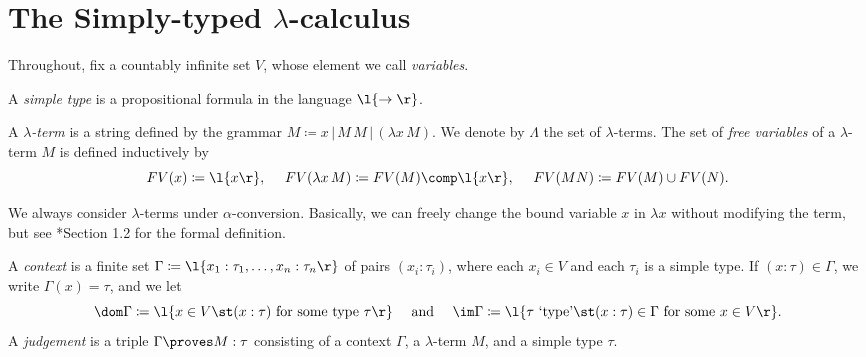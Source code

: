 \documentclass[reqno]{amsart}
\begin{document}
    \section{The Simply-typed $\lambda$-calculus}

    Throughout, fix a countably infinite set $V$, whose element we call \textit{variables}.

    \begin{definition}
        A \textit{simple type} is a propositional formula in the language $\l\{\rightarrow\r\}$.
    \end{definition}

    \begin{definition}
        A \textit{$\lambda$-term} is a string defined by the grammar $M\coloneqq x\,|\,M\,M\,|\,(\lambda x\,M)$. We denote by $\Lambda$ the set of $\lambda$-terms. The set of \textit{free variables} of a $\lambda$-term $M$ is defined inductively by
        \begin{equation*}
            FV(x)\coloneqq\l\{x\r\},\ \ \ \ FV(\lambda x\,M)\coloneqq FV(M)\comp\l\{x\r\},\ \ \ \ FV(MN)\coloneqq FV(M)\cup FV(N).
        \end{equation*}
    \end{definition}

    \begin{remark}
        We always consider $\lambda$-terms under $\alpha$-conversion. Basically, we can freely change the bound variable $x$ in $\lambda x$ without modifying the term, but see \cite{SU06}*{Section 1.2} for the formal definition.
    \end{remark}

    \begin{definition}
        A \textit{context} is a finite set $\Gamma\coloneqq\l\{x_1:\tau_1,\dots,x_n:\tau_n\r\}$ of pairs $(x_i:\tau_i)$, where each $x_i\in V$ and each $\tau_i$ is a simple type. If $(x:\tau)\in\Gamma$, we write $\Gamma(x)=\tau$, and we let
        \begin{equation*}
            \dom\Gamma\coloneqq\l\{x\in V\st(x:\tau)\textrm{ for some type }\tau\r\}\ \ \ \ \textrm{and}\ \ \ \ \im\Gamma\coloneqq\l\{\tau\textrm{ `type'}\st(x:\tau)\in\Gamma\textrm{ for some }x\in V\r\}.
        \end{equation*}
        A \textit{judgement} is a triple $\Gamma\proves M:\tau$ consisting of a context $\Gamma$, a $\lambda$-term $M$, and a simple type $\tau$.
    \end{definition}
\end{document}
